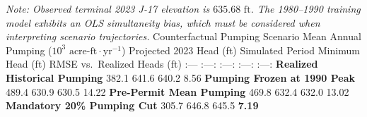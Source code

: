 \documentclass[11pt]{article}
\begin{document}
\emph{Note: Observed terminal 2023 J-17 elevation is
\(635.68\text{ ft}\). The 1980--1990 training model exhibits an OLS
simultaneity bias, which must be considered when interpreting scenario
trajectories.} \textbar{} Counterfactual Pumping Scenario \textbar{}
Mean Annual Pumping (\(10^3\text{ acre-ft}\cdot\text{yr}^{-1}\))
\textbar{} Projected 2023 Head (ft) \textbar{} Simulated Period Minimum
Head (ft) \textbar{} RMSE vs.~Realized Heads (ft) \textbar{} \textbar{}
:--- \textbar{} :---: \textbar{} :---: \textbar{} :---: \textbar{} :---:
\textbar{} \textbar{} \textbf{Realized Historical Pumping} \textbar{}
382.1 \textbar{} 641.6 \textbar{} 640.2 \textbar{} 8.56 \textbar{}
\textbar{} \textbf{Pumping Frozen at 1990 Peak} \textbar{} 489.4
\textbar{} 630.9 \textbar{} 630.5 \textbar{} 14.22 \textbar{} \textbar{}
\textbf{Pre-Permit Mean Pumping} \textbar{} 469.8 \textbar{} 632.4
\textbar{} 632.0 \textbar{} 13.02 \textbar{} \textbar{}
\textbf{Mandatory 20\% Pumping Cut} \textbar{} 305.7 \textbar{} 646.8
\textbar{} 645.5 \textbar{} \textbf{7.19} \textbar{}
\end{document}
